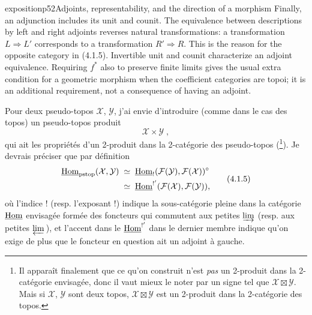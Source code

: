 \begin{dcomment}{exposition}{p52}{Adjoints, representability, and the direction of a morphism}
Finally, an adjunction includes its unit and counit. The equivalence between descriptions by left and right adjoints reverses natural transformations: a transformation $L\Rightarrow L'$ corresponds to a transformation $R'\Rightarrow R$. This is the reason for the opposite category in (4.1.5). Invertible unit and counit characterize an adjoint equivalence. Requiring $f^*$ also to preserve finite limits gives the usual extra condition for a geometric morphism when the coefficient categories are topoi; it is an additional requirement, not a consequence of having an adjoint.
\end{dcomment}


Pour deux pseudo-topos $\mathcal{X}$, $\mathcal{Y}$, j'ai envie d'introduire (comme dans le cas des topos) un pseudo-topos produit
\[
\mathcal{X}\times\mathcal{Y}\;,
\tag*{(4.1.4)}
\]
qui ait les propriétés d'un 2-produit dans la 2-catégorie des pseudo-topos (\footnote{Il apparaît finalement que ce qu'on construit n'est \textit{pas} un 2-produit dans la 2-catégorie envisagée, donc il vaut mieux le noter par un signe tel que $\mathcal{X}\boxtimes\mathcal{Y}$. Mais si $\mathcal{X}$, $\mathcal{Y}$ sont deux topos, $\mathcal{X}\boxtimes\mathcal{Y}$ est un 2-produit dans la 2-catégorie des topos.}). Je devrais préciser que par définition
\[
\begin{aligned}
\underline{\mathrm{Hom}}_{\mathrm{pstop}}(\mathcal{X},\mathcal{Y}) \;&\simeq\; \underline{\mathrm{Hom}}_!(\mathcal{F}(\mathcal{Y}),\mathcal{F}(\mathcal{X}))^\circ\\
&\simeq\; \underline{\mathrm{Hom}}^{!'}(\mathcal{F}(\mathcal{X}),\mathcal{F}(\mathcal{Y})),
\end{aligned}
\tag*{(4.1.5)}
\]
où l'indice ! (resp. l'exposant !) indique la sous-catégorie pleine dans la catégorie $\underline{\mathrm{Hom}}$ envisagée formée des foncteurs qui commutent aux petites $\varinjlim$ (resp. aux petites
$\varprojlim$\,), et l'accent dans le $\underline{\mathrm{Hom}}^{!'}$ dans le dernier membre indique qu'on exige de plus que le foncteur en question ait un adjoint à gauche.

